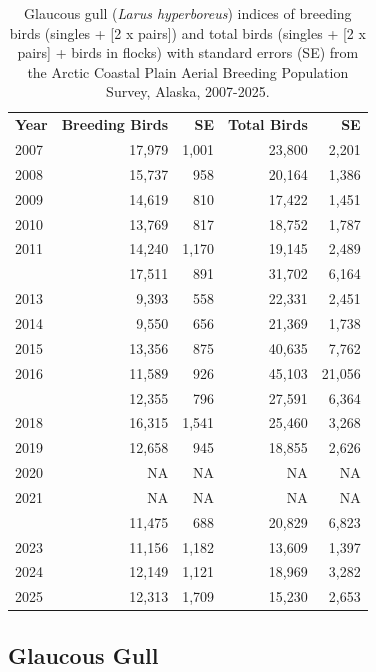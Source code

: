 \documentclass[
]{article}
\begin{document}
\begin{longtable}[t]{lrrrr}

\caption{\label{tbl-GLGU}Glaucous gull (\emph{Larus hyperboreus})
indices of breeding birds (singles + {[}2 x pairs{]}) and total birds
(singles + {[}2 x pairs{]} + birds in flocks) with standard errors (SE)
from the Arctic Coastal Plain Aerial Breeding Population Survey, Alaska,
2007-2025.}

\tabularnewline

\\
\toprule
\textbf{Year} & \textbf{Breeding Birds} & \textbf{SE} & \textbf{Total Birds} & \textbf{SE}\\
\midrule
2007 & 17,979 & 1,001 & 23,800 & 2,201\\
2008 & 15,737 & 958 & 20,164 & 1,386\\
2009 & 14,619 & 810 & 17,422 & 1,451\\
2010 & 13,769 & 817 & 18,752 & 1,787\\
2011 & 14,240 & 1,170 & 19,145 & 2,489\\
\addlinespace
2012 & 17,511 & 891 & 31,702 & 6,164\\
2013 & 9,393 & 558 & 22,331 & 2,451\\
2014 & 9,550 & 656 & 21,369 & 1,738\\
2015 & 13,356 & 875 & 40,635 & 7,762\\
2016 & 11,589 & 926 & 45,103 & 21,056\\
\addlinespace
2017 & 12,355 & 796 & 27,591 & 6,364\\
2018 & 16,315 & 1,541 & 25,460 & 3,268\\
2019 & 12,658 & 945 & 18,855 & 2,626\\
2020 & NA & NA & NA & NA\\
2021 & NA & NA & NA & NA\\
\addlinespace
2022 & 11,475 & 688 & 20,829 & 6,823\\
2023 & 11,156 & 1,182 & 13,609 & 1,397\\
2024 & 12,149 & 1,121 & 18,969 & 3,282\\
2025 & 12,313 & 1,709 & 15,230 & 2,653\\
\bottomrule

\end{longtable}

\endgroup{}

\newpage{}

\subsection*{Glaucous Gull}\label{glaucous-gull-2}
\end{document}
